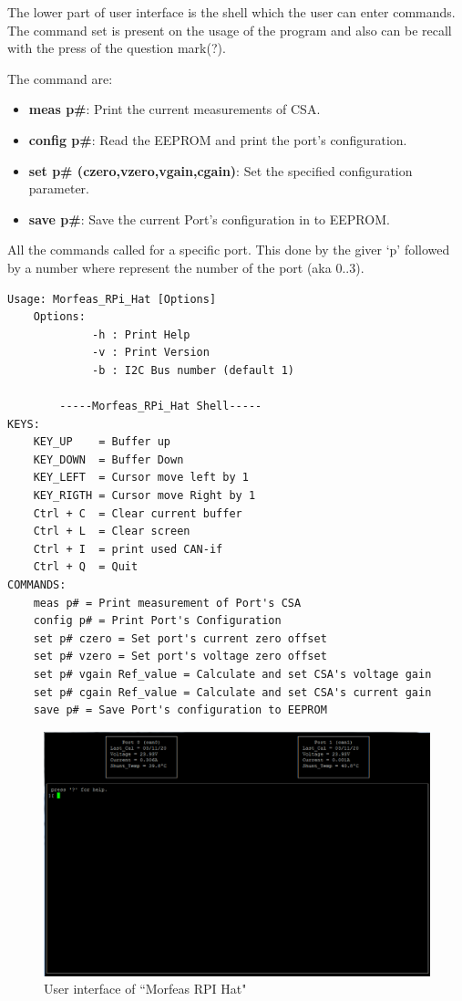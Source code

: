 The lower part of user interface is the shell which the user can enter commands. The command set is present on the usage of the program and also can be recall with the press of the question mark(?).  

The command are:    
\begin{itemize}
	\item \textbf{meas p\#}: Print the current measurements of CSA.
	\item \textbf{config p\#}: Read the EEPROM and print the port's configuration.
	\item \textbf{set p\# (czero,vzero,vgain,cgain)}: Set the specified configuration parameter.
	\item \textbf{save p\#}: Save the current Port's configuration in to EEPROM. 
\end{itemize}
All the commands called for a specific port. This done by the giver `p' followed by a number where represent the number of the port (aka 0..3).
\newpage
\begin{lstlisting}[frame=single,caption=Usage of ``Morfeas\_RPi\_Hat", label=lst:usage]
Usage: Morfeas_RPi_Hat [Options]
    Options:
             -h : Print Help
             -v : Print Version
             -b : I2C Bus number (default 1)

        -----Morfeas_RPi_Hat Shell-----
KEYS:
    KEY_UP    = Buffer up
    KEY_DOWN  = Buffer Down
    KEY_LEFT  = Cursor move left by 1
    KEY_RIGTH = Cursor move Right by 1
    Ctrl + C  = Clear current buffer
    Ctrl + L  = Clear screen
    Ctrl + I  = print used CAN-if
    Ctrl + Q  = Quit
COMMANDS:
    meas p# = Print measurement of Port's CSA
    config p# = Print Port's Configuration
    set p# czero = Set port's current zero offset
    set p# vzero = Set port's voltage zero offset
    set p# vgain Ref_value = Calculate and set CSA's voltage gain
    set p# cgain Ref_value = Calculate and set CSA's current gain
    save p# = Save Port's configuration to EEPROM
\end{lstlisting}

\begin{figure}[h]
\centering
	\includegraphics[width=5in,angle=0]{./Artwork/UIF.png}
	\caption{User interface of ``Morfeas RPI Hat"}
	\label{fig:Morfeas_RPi_Hat_UIF}
\end{figure}